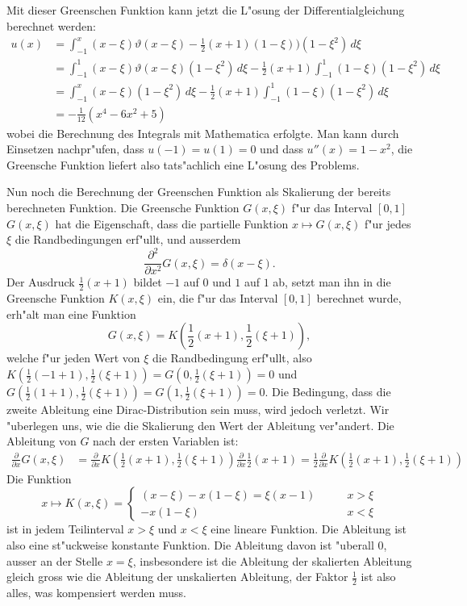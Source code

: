 {\begin{loesung}
Mit dieser Greenschen Funktion kann jetzt die L"osung der
Differentialgleichung berechnet werden:
\begin{align*}
u(x)&=\int_{-1}^x
(x-\xi)\vartheta(x-\xi)-{\textstyle\frac12}(x+1)(1-\xi)
)(1-\xi^2)\,d\xi
\\
&=
\int_{-1}^1(x-\xi)\vartheta(x-\xi)(1-\xi^2)\,d\xi
-{\textstyle\frac12}(x+1)\int_{-1}^1(1-\xi)(1-\xi^2)\,d\xi
\\
&=
\int_{-1}^x(x-\xi)(1-\xi^2)\,d\xi
-{\textstyle\frac12}(x+1)\int_{-1}^1(1-\xi)(1-\xi^2)\,d\xi
\\
&=
-\frac1{12}(x^4-6x^2+5)
\end{align*}
wobei die Berechnung des Integrals mit Mathematica erfolgte.
Man kann durch Einsetzen nachpr"ufen, dass
$u(-1)=u(1)=0$ und dass $u''(x)=1-x^2$, die Greensche Funktion
liefert also tats"achlich eine L"osung des Problems.

Nun noch die Berechnung der Greenschen Funktion als Skalierung
der bereits berechneten Funktion. Die Greensche Funktion $G(x,\xi)$ f"ur
das Interval $[0,1]$
$G(x,\xi)$ hat die Eigenschaft, dass die partielle Funktion
$x\mapsto G(x,\xi)$ f"ur jedes $\xi$ die Randbedingungen erf"ullt,
und ausserdem
\[
\frac{\partial^2}{\partial x^2}G(x,\xi)=\delta(x-\xi).
\]
Der Ausdruck $\frac12(x+1)$ bildet $-1$ auf $0$ und $1$ auf $1$
ab, setzt man ihn in die Greensche Funktion $K(x,\xi)$ ein,
die f"ur das Interval $[0,1]$ berechnet wurde,
erh"alt man eine Funktion
\[
G(x,\xi)=K({\textstyle\frac12}(x+1),{\textstyle\frac12}(\xi+1)),
\]
welche
f"ur jeden Wert von $\xi$ die Randbedingung erf"ullt, also
$K(\frac12(-1+1),\frac12(\xi+1))=G(0,\frac12(\xi+1))=0$ und
$G(\frac12(1+1),\frac12(\xi+1))=G(1,\frac12(\xi+1))=0$.
Die Bedingung, dass die zweite Ableitung eine Dirac-Distribution
sein muss, wird jedoch verletzt. Wir "uberlegen uns, wie die
die Skalierung den Wert der Ableitung ver"andert.
Die Ableitung von $G$ nach der ersten Variablen ist:
\begin{align*}
\frac{\partial}{\partial x}G(x,\xi)
&=
\frac{\partial}{\partial x}K({\textstyle\frac12}(x+1),{\textstyle\frac12}(\xi+1))\frac{\partial}{\partial x}\frac12(x+1)
=
\frac12\frac{\partial }{\partial x}K({\textstyle \frac12}(x+1), {\textstyle\frac12}(\xi+1))
\end{align*}
Die Funktion
\[
x\mapsto K(x,\xi)=\begin{cases}
(x-\xi)-x(1-\xi)=\xi(x-1)&\qquad x>\xi
\\
-x(1-\xi)&\qquad x<\xi
\end{cases}
\]
ist in jedem Teilinterval $x>\xi$ und $x<\xi$ eine lineare Funktion. Die Ableitung
ist also eine st"uckweise konstante Funktion.
Die Ableitung davon ist "uberall $0$, ausser an der Stelle $x=\xi$,
insbesondere ist die Ableitung der skalierten Ableitung gleich gross
wie die Ableitung der unskalierten Ableitung, der Faktor $\frac12$ ist
also alles, was kompensiert werden muss.


\end{loesung}}

